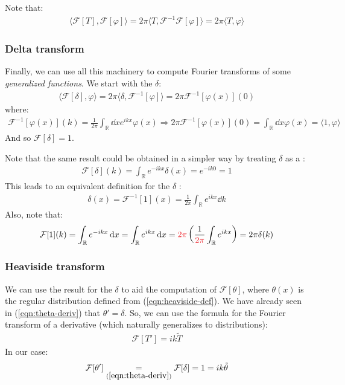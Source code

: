 \documentclass[../template.tex]{subfiles}
\begin{document}
Note that:
\begin{align}\label{eqn:unitary}
    \langle \mathcal{F}[T], \mathcal{F}[\varphi] \rangle = 2\pi \langle T, \mathcal{F}^{-1} \mathcal{F}[\varphi] \rangle = 2 \pi \langle T, \varphi \rangle
\end{align}

\subsubsection{Delta transform}
Finally, we can use all this machinery to compute Fourier transforms of some \textit{generalized functions}. We start with the $\delta$:
\begin{align*}
    \langle \mathcal{F}[\delta], \varphi \rangle = 2 \pi\langle \delta, \mathcal{F}^{-1}[\varphi]\rangle = 2\pi\mathcal{F}^{-1}[\varphi(x)](0)
\end{align*}
where:
\begin{align*}
    \mathcal{F}^{-1}[\varphi(x)](k) = \frac{1}{2\pi} \int_{\mathbb{R}} \dd{x} e^{ikx} \varphi(x) \Rightarrow 2 \pi\mathcal{F}^{-1}[\varphi(x)](0) = \int_{\mathbb{R}} \dd{x} \varphi(x) = \langle 1, \varphi \rangle 
\end{align*}
And so $\mathcal{F}[\delta] = 1$. 

\medskip

Note that the same result could be obtained in a simpler way by treating $\delta$ as a :
\begin{align*}
    \mathcal{F}[\delta](k) = \int_{\mathbb{R}} e^{-ikx} \delta(x) = e^{-ik 0} =  1
\end{align*}
This leads to an equivalent definition for the $\delta$ :
\begin{align*}
    \delta(x) = \mathcal{F}^{-1}[1](x) = \frac{1}{2\pi} \int_{\mathbb{R}} e^{ikx} \dd{k}
\end{align*}
Also, note that:
\begin{align} \label{eqn:1-transform}
    \mathcal{F}[1](k) = \int_{\mathbb{R}} e^{-ikx} \dd{x} = \int_{\mathbb{R}} e^{ikx} \dd{x} = \textcolor{Red}{2 \pi} \left( \frac{1}{\textcolor{Red}{2 \pi}} \int_{\mathbb{R}} e^{ikx}  \right) = 2\pi \delta(k)
\end{align}

\subsubsection{Heaviside transform}
We can use the result for the $\delta$ to aid the computation of $\mathcal{F}[\theta]$, where $\theta(x)$ is the regular distribution defined from (\ref{eqn:heaviside-def}). We have already seen in (\ref{eqn:theta-deriv}) that $\theta' = \delta$. So, we can use the formula for the Fourier transform of a derivative (which naturally generalizes to distributions):
\begin{align} \label{eqn:derivative-property}
    \mathcal{F}[T'] = ik \tilde{T}
\end{align}
In our case:
\begin{align} \label{eqn:theta-transf1}
    \mathcal{F}[\theta'] \underset{(\ref{eqn:theta-deriv})}{=}  \mathcal{F}[\delta] = 1 = ik \tilde{\theta}
\end{align}
\end{document}
